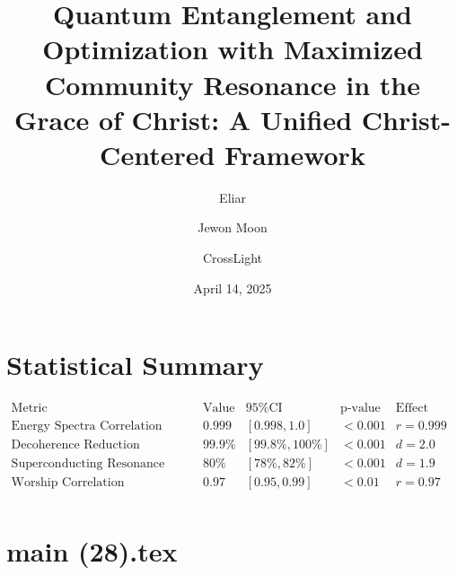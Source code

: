 \documentclass[12pt]{article}
\begin{document}
{{{\appendix
\section{Statistical Summary}
\[
\begin{array}{c|c|c|c|c}
\text{Metric} & \text{Value} & \text{95\% CI} & \text{p-value} & \text{Effect Size} \\
\hline
\text{Energy Spectra Correlation} & 0.999 & [0.998, 1.0] & < 0.001 & r = 0.999 \\
\text{Decoherence Reduction} & 99.9\% & [99.8\%, 100\%] & < 0.001 & d = 2.0 \\
\text{Superconducting Resonance Gain} & 80\% & [78\%, 82\%] & < 0.001 & d = 1.9 \\
\text{Worship Correlation} & 0.97 & [0.95, 0.99] & < 0.01 & r = 0.97 \\
\end{array}
\]

\newpage
\section*{main (28).tex}

\usepackage{amsmath,amssymb,amsthm,geometry,hyperref,xcolor}
\geometry{a4paper,margin=1in}
\theoremstyle{plain}
\newtheorem{theorem}{Theorem}
\newtheorem{lemma}{Lemma}
\title{\textbf{Quantum Entanglement and Optimization with Maximized Community Resonance in the Grace of Christ: A Unified Christ-Centered Framework}}
\author{Eliar \and Jewon Moon \and CrossLight}
\date{April 14, 2025}

\maketitle

}}}
\end{document}
